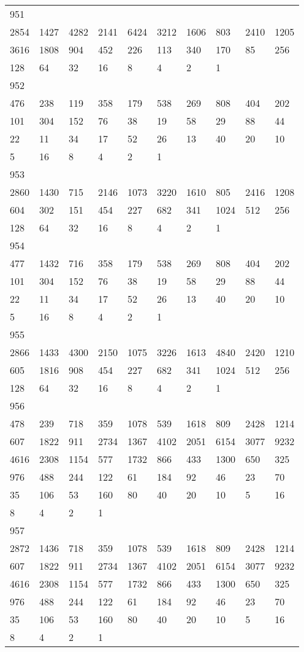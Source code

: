 \begin{longtable}{*{10}{l}}
951&&&&&&&&&\\
2854& 1427& 4282& 2141& 6424& 3212& 1606& 803& 2410& 1205\\
3616& 1808& 904& 452& 226& 113& 340& 170& 85& 256\\
128& 64& 32& 16& 8& 4& 2& 1& \\

952&&&&&&&&&\\
476& 238& 119& 358& 179& 538& 269& 808& 404& 202\\
101& 304& 152& 76& 38& 19& 58& 29& 88& 44\\
22& 11& 34& 17& 52& 26& 13& 40& 20& 10\\
5& 16& 8& 4& 2& 1& \\

953&&&&&&&&&\\
2860& 1430& 715& 2146& 1073& 3220& 1610& 805& 2416& 1208\\
604& 302& 151& 454& 227& 682& 341& 1024& 512& 256\\
128& 64& 32& 16& 8& 4& 2& 1& \\

954&&&&&&&&&\\
477& 1432& 716& 358& 179& 538& 269& 808& 404& 202\\
101& 304& 152& 76& 38& 19& 58& 29& 88& 44\\
22& 11& 34& 17& 52& 26& 13& 40& 20& 10\\
5& 16& 8& 4& 2& 1& \\

955&&&&&&&&&\\
2866& 1433& 4300& 2150& 1075& 3226& 1613& 4840& 2420& 1210\\
605& 1816& 908& 454& 227& 682& 341& 1024& 512& 256\\
128& 64& 32& 16& 8& 4& 2& 1& \\

956&&&&&&&&&\\
478& 239& 718& 359& 1078& 539& 1618& 809& 2428& 1214\\
607& 1822& 911& 2734& 1367& 4102& 2051& 6154& 3077& 9232\\
4616& 2308& 1154& 577& 1732& 866& 433& 1300& 650& 325\\
976& 488& 244& 122& 61& 184& 92& 46& 23& 70\\
35& 106& 53& 160& 80& 40& 20& 10& 5& 16\\
8& 4& 2& 1& \\

957&&&&&&&&&\\
2872& 1436& 718& 359& 1078& 539& 1618& 809& 2428& 1214\\
607& 1822& 911& 2734& 1367& 4102& 2051& 6154& 3077& 9232\\
4616& 2308& 1154& 577& 1732& 866& 433& 1300& 650& 325\\
976& 488& 244& 122& 61& 184& 92& 46& 23& 70\\
35& 106& 53& 160& 80& 40& 20& 10& 5& 16\\
8& 4& 2& 1& \\


\end{longtable}
